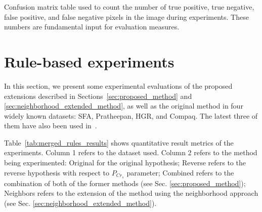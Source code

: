 \begin{table}[H]
    \centering


    \caption[Confusion matrix table used during experiments]{Confusion matrix table used to count the number of true positive, true negative, false positive, and false negative pixels in the image during experiments. These numbers are fundamental input for evaluation measures.}
    \label{tab:confusion_matrix}
\end{table}



\section{Rule-based experiments}
\label{sec:rule_based_experiments}
In this section, we present some experimental evaluations of the proposed extensions described in Sections~\ref{sec:proposed_method} and \ref{sec:neighborhood_extended_method}, as well as the original method in four widely known datasets: SFA, Pratheepan, HGR, and Compaq. The latest three of them have also been used in~\citet{brancati:17}.

Table~\ref{tab:merged_rules_results} shows quantitative result metrics of the experiments. Column 1 refers to the dataset used. Column 2 refers to the method being experimented: Original for the original hypothesis; Reverse refers to the reverse hypothesis with respect to $P_{Cr_{s}}$ parameter; Combined refers to the combination of both of the former methods (see  Sec. \ref{sec:proposed_method}); Neighbors refers to the extension of the method using the neighborhood approach (see  Sec. \ref{sec:neighborhood_extended_method}).

